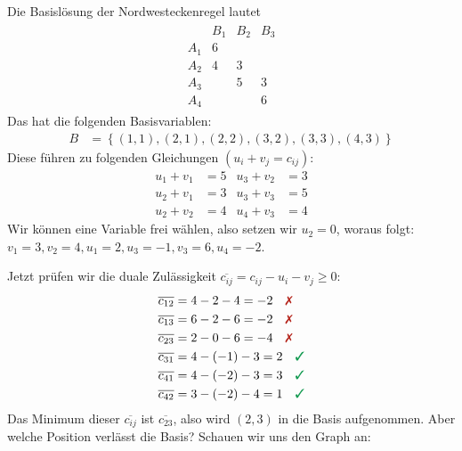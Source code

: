 \documentclass[
a4paper, %
11pt,
]
{scrartcl}
\begin{document}
\begin{enumerate}[(a)]
    Die Basislösung der Nordwesteckenregel lautet
    \begin{align*}
      \begin{matrix}
            & B_1 & B_2 & B_3\\
        A_1 & 6\\
        A_2 & 4   & 3\\
        A_3 &     & 5   & 3\\
        A_4 &     &     & 6
      \end{matrix}
    \end{align*}
    Das hat die folgenden Basisvariablen:
    \begin{align*}
      B & = \left\{ (1,1), (2,1), (2,2), (3,2), (3,3), (4,3) \right\}
    \end{align*}
    Diese führen zu folgenden Gleichungen $(u_i + v_j = c_{ij})$:
    \begin{align*}
      u_1 + v_1 & = 5 & u_3 + v_2 & = 3\\
      u_2 + v_1 & = 3 & u_3 + v_3 & = 5\\
      u_2 + v_2 & = 4 & u_4 + v_3 & = 4
    \end{align*}
    Wir können eine Variable frei wählen, also setzen wir $u_2 = 0$, woraus
    folgt: $v_1 = 3, v_2 = 4, u_1 = 2, u_3 = -1, v_3 = 6, u_4 = -2$.

    Jetzt prüfen wir die duale Zulässigkeit $\overline{c_{ij}} = c_{ij} - u_i -
    v_j \geq 0$:
    \begin{align*}
      \overline{c_{12}} & = 4 - 2 - 4 = -2 \quad \falsch\\
      \overline{c_{13}} & = 6 - 2 - 6 = -2 \quad \falsch\\
      \overline{c_{23}} & = 2 - 0 - 6 = -4 \quad \falsch\\
      \overline{c_{31}} & = 4 - (-1) - 3 = 2 \quad \richtig\\
      \overline{c_{41}} & = 4 - (-2) - 3 = 3 \quad \richtig\\
      \overline{c_{42}} & = 3 - (-2) - 4 = 1 \quad \richtig
    \end{align*}
    Das Minimum dieser $\overline{c_{ij}}$ ist $\overline{c_{23}}$, also wird
    $(2,3)$ in die Basis aufgenommen. Aber welche Position verlässt die Basis?
    Schauen wir uns den Graph an:
    \begin{center}
\end{center}
\end{enumerate}
\end{document}
